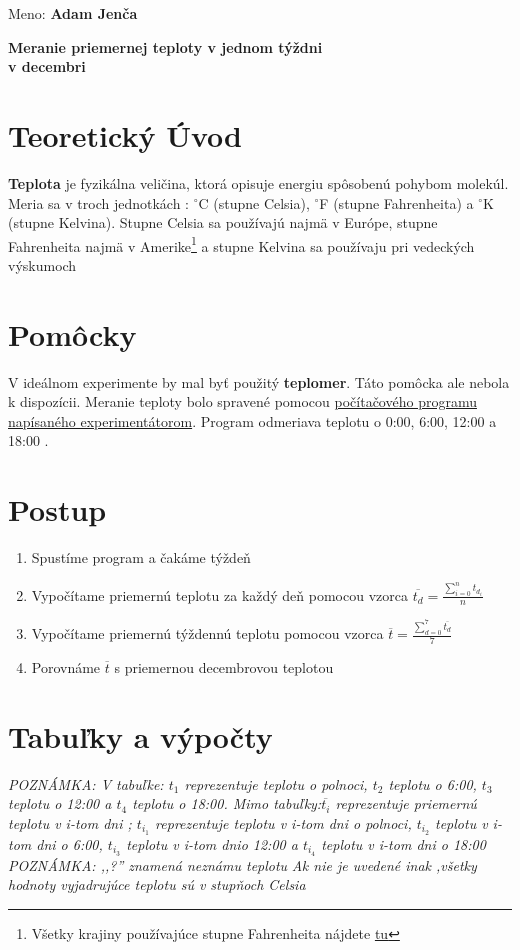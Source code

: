 \documentclass{article}
\begin{document}
\large Meno: \textbf{Adam Jenča}
\begin{center} 
	\huge \textbf{Meranie priemernej teploty v jednom týždni \\ v decembri} 
\end{center}
\normalsize
\vskip 5cm
\section{Teoretický Úvod}
\textbf{Teplota} je fyzikálna veličina, ktorá opisuje energiu spôsobenú pohybom molekúl.
Meria sa v troch jednotkách : $^{\circ}$C (stupne Celsia), $^{\circ}$F (stupne Fahrenheita) a $^{\circ}$K (stupne Kelvina). Stupne Celsia sa používajú najmä v Európe, stupne Fahrenheita najmä v Amerike\footnote{Všetky krajiny používajúce stupne Fahrenheita nájdete \href{https://worldpopulationreview.com/country-rankings/countries-that-use-fahrenheit}{tu}} a stupne Kelvina sa používaju pri vedeckých výskumoch
\section{Pomôcky}
V ideálnom experimente by mal byť použitý \textbf{teplomer}.
Táto pomôcka ale nebola k dispozícii.
Meranie teploty bolo spravené pomocou \href{https://github.com/jenca-adam/skolskeveci/blob/main/fyzika/teplota/data.py}{počítačového programu napísaného experimentátorom}.
Program odmeriava teplotu o 0:00, 6:00, 12:00 a  18:00 .
\section{Postup}
\begin{enumerate}
\item Spustíme program a čakáme týždeň\\
\item  Vypočítame priemernú teplotu za každý deň pomocou vzorca  $\overline{t_d} = \frac{\displaystyle \sum_{i=0}^{n} t_{d_i}}{n}$
\item Vypočítame priemernú týždennú teplotu pomocou vzorca $\overline{t}=\frac{\displaystyle \sum_{d=0}^7 \overline{t_d}}{7}$
\item Porovnáme $\overline{t}$ s priemernou decembrovou teplotou
\end{enumerate}
\section{Tabuľky a výpočty}
\textit{POZNÁMKA: V tabuľke: $t_1$ reprezentuje teplotu o polnoci, $t_2$ teplotu o 6:00, $t_3$ teplotu o 12:00 a $t_4$ teplotu o 18:00. Mimo tabuľky:$\overline{t_i}$ reprezentuje priemernú teplotu v i-tom dni ; $t_{i_1}$ reprezentuje teplotu v i-tom dni o polnoci, $t_{i_2}$ teplotu v i-tom dni o 6:00, $t_{i_3}$ teplotu v i-tom dnio 12:00 a $t_{i_4}$ teplotu v i-tom dni o 18:00}\\
\textit{POZNÁMKA: ,,?'' znamená neznámu teplotu}
\textit{Ak nie je uvedené inak ,všetky hodnoty vyjadrujúce teplotu sú v stupňoch Celsia}
\end{document}
